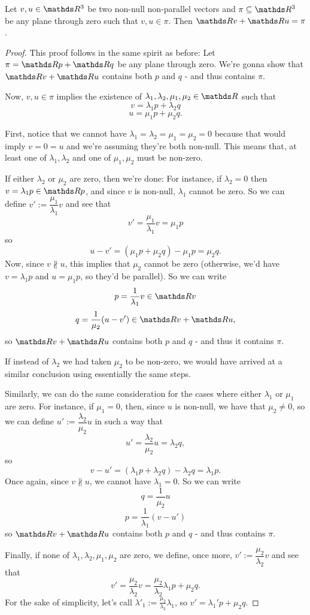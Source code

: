 \begin{prop}
	Let $v,u\in\R^3$ be  two non-null non-parallel vectors and $\pi\subseteq\R^3$ be any plane through zero such that $v,u\in \pi$. Then $\R v+\R u=\pi$.
\end{prop}
\begin{proof}
	This proof follows in the same spirit as before: Let $\pi=\R p+\R q$ be any plane through zero. We're gonna show that $\R v+\R u$ contains both $p$ and $q$ - and thus contains $\pi$.
	
	Now, $v,u\in\pi$ implies the existence of $\lambda_1,\lambda_2,\mu_1,\mu_2\in \R$ such that
	\[v=\lambda_1 p+\lambda_2 q\]
	\[u=\mu_1p+\mu_2q.\]
	
	First, notice that we cannot have $\lambda_1=\lambda_2=\mu_1=\mu_2=0$ because that would imply $v=0=u$ and we're assuming they're both non-null. This means that, at least one of $\lambda_1,\lambda_2$ and one of $\mu_1,\mu_2$ must be non-zero.
	
	If either $\lambda_2$ or $\mu_2$ are zero, then we're done: For instance, if $\lambda_2=0$ then $v=\lambda_1p\in\R p$, and since $v$ is non-null, $\lambda_1$ cannot be zero. So we can define $v':=\dfrac{\mu_1}{\lambda_1}v$ and see that
	\[v'=\frac{\mu_1}{\lambda_1}v=\mu_1p\]so
	\[u-v'=(\mu_1p+\mu_2q)-\mu_1p=\mu_2q.\] Now, since $v\nparallel u$, this implies that $\mu_2$ cannot be zero (otherwise, we'd have $v=\lambda_1p$ and $u=\mu_1p$, so they'd be parallel). So we can write
	\[p=\frac{1}{\lambda_1}v\in\R v\]
	\[q=\frac{1}{\mu_2}(u-v')\in\R v+\R u,\]so $\R v+\R u$ contains both $p$ and $q$ - and thus it contains $\pi$.
	
	If instead of $\lambda_2$ we had taken $\mu_2$ to be non-zero, we would have arrived at a similar conclusion using essentially the same steps.
	
	\bigskip
	Similarly, we can do the same consideration for the cases where either $\lambda_1$ or $\mu_1$ are zero. For instance, if $\mu_1=0$, then, since $u$ is non-null, we have that $\mu_2\neq 0$, so we can define $u':=\dfrac{\lambda_2}{\mu_2}u$ in such a way that
	\[u'=\frac{\lambda_2}{\mu_2}u=\lambda_2q,\]so
	\[v-u'=(\lambda_1p+\lambda_2q)-\lambda_2q=\lambda_1p.\]Once again, since $v\nparallel u$, we cannot have $\lambda_1=0$. So we can write
	\[q=\frac{1}{\mu_2}u\]
	\[p=\frac{1}{\lambda_1}(v-u')\]so $\R v+\R u$ contains both $p$ and $q$ - and thus contains $\pi$.
	
	\bigskip
	Finally, if none of $\lambda_1,\lambda_2,\mu_1,\mu_2$ are zero, we define, once more, $v':=\dfrac{\mu_2}{\lambda_2}v$ and see that 
	\[v'=\frac{\mu_2}{\lambda_2}v=\frac{\mu_2}{\lambda_2}\lambda_1p+\mu_2q.\]For the sake of simplicity, let's call $\lambda'_1:=\frac{\mu_2}{\lambda_2}\lambda_1$, so $v'=\lambda_1'p+\mu_2q$.
	

\end{proof}
